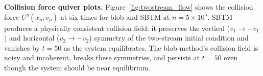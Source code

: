 \documentclass[]{article}
\numberwithin{equation}{section}
\begin{document}
%

\textbf{Collision force quiver plots.}  Figure~\ref{fig:twostream_flow} shows the collision force $U^{\eta}(x_p,v_p)$ at six times for blob and SBTM at $n = 5 \times 10^5$.  SBTM produces a physically consistent collision field: it preserves the vertical ($v_1 \to -v_1$) and horizontal ($v_2 \to -v_2$) symmetry of the two-stream initial condition and vanishes by $t = 50$ as the system equilibrates.  The blob method's collision field is noisy and incoherent, breaks these symmetries, and persists at $t = 50$ even though the system should be near equilibrium.
\end{document}
